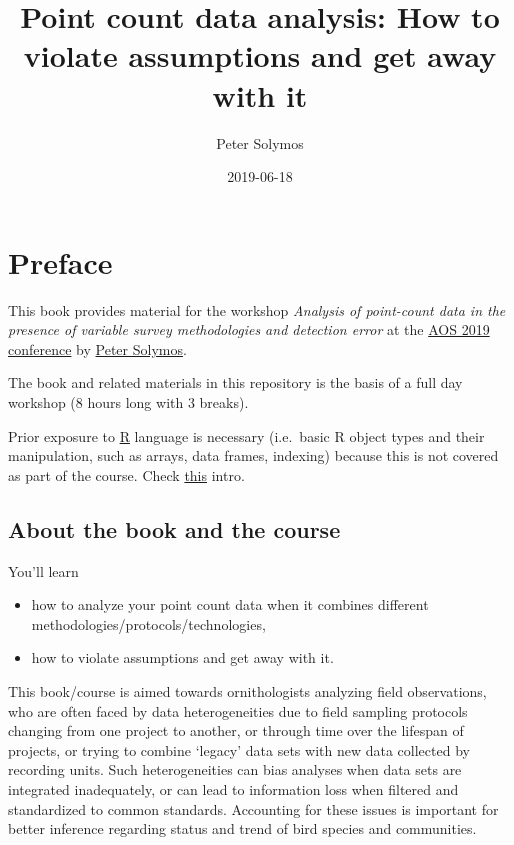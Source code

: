 \documentclass[12pt,]{book}
\title{Point count data analysis: How to violate assumptions and get away with it}
\author{Peter Solymos}
\date{2019-06-18}
\providecommand{\tightlist}{%
  \setlength{\itemsep}{0pt}\setlength{\parskip}{0pt}}
\begin{document}
\maketitle

{
\hypersetup{linkcolor=black}
\setcounter{tocdepth}{2}
\tableofcontents
}
\listoftables
\listoffigures
\hypertarget{foreword}{%
\chapter*{Preface}\label{foreword}}

This book provides material for the workshop
\emph{Analysis of point-count data in the presence of variable survey methodologies and detection error}
at the \href{https://amornithmeeting.org/}{AOS 2019 conference}
by \href{http://peter.solymos.org}{Peter Solymos}.

The book and related materials in this repository is the basis of a
full day workshop (8 hours long with 3 breaks).

Prior exposure to \href{https://www.r-project.org/}{R} language is necessary
(i.e.~basic R object types and their manipulation, such as arrays, data frames, indexing)
because this is not covered as part of the course.
Check \href{_etc/R-basics.pdf}{this} intro.

\hypertarget{about-the-book-and-the-course}{%
\section*{About the book and the course}\label{about-the-book-and-the-course}}

You'll learn

\begin{itemize}
\tightlist
\item
  how to analyze your point count data when it combines different methodologies/protocols/technologies,
\item
  how to violate assumptions and get away with it.
\end{itemize}

This book/course is aimed towards ornithologists analyzing field observations,
who are often faced by data heterogeneities due to
field sampling protocols changing from one project to another,
or through time over the lifespan of projects, or trying to combine
`legacy' data sets with new data collected by recording units.
Such heterogeneities can bias analyses when data sets are integrated
inadequately, or can lead to information loss when filtered and standardized to
common standards. Accounting for these issues is important for better
inference regarding status and trend of bird species and communities.
\end{document}

